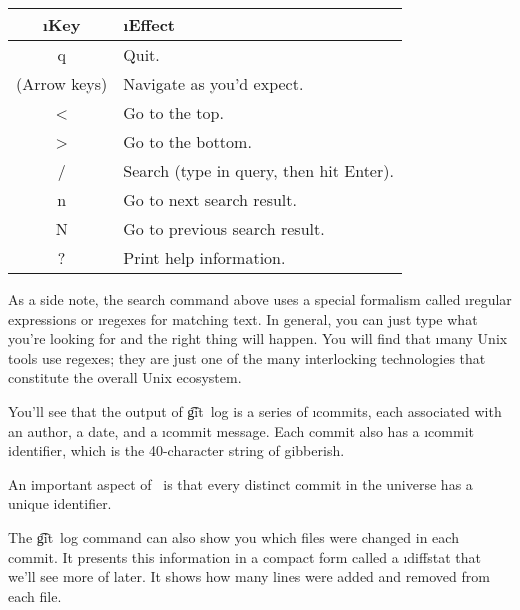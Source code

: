 \documentclass[letterpaper,12pt,titlepage,twoside]{article}
\begin{document}
\begin{center}
\begin{tabular}{>{\ttfamily}cl}
\rmfamily\i{Key} & \i{Effect} \\ \hline
q & Quit. \\
\rmfamily(Arrow keys) & Navigate as you'd expect. \\
< & Go to the top. \\
> & Go to the bottom. \\
/ & Search (type in query, then hit Enter). \\
n & Go to next search result. \\
N & Go to previous search result. \\
? & Print help information.
\end{tabular}
\end{center}

As a side note, the search command above uses a special formalism called
\i{regular expressions} or \i{regexes} for matching text. In general, you can
just type what you're looking for and the right thing will happen. You will
find that \i{many} Unix tools use regexes; they are just one of the many
interlocking technologies that constitute the overall Unix ecosystem.


You'll see that the output of \t{git~log} is a series of \i{commits}, each
associated with an author, a date, and a \i{commit message}. Each commit also
has a \i{commit identifier}, which is the 40-character string of gibberish.


An important aspect of \git\ is that every distinct commit in the universe has
a unique identifier.


The \t{git~log} command can also show you which files were changed in each
commit. It presents this information in a compact form called a \i{diffstat}
that we'll see more of later. It shows how many lines were added and removed
from each file.


\end{document}
